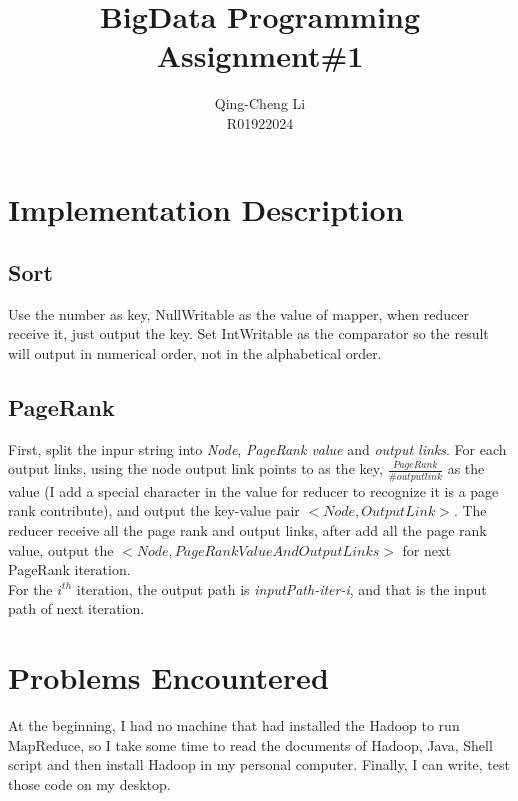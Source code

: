 \documentclass[11pt]{article}
\title{\textbf{BigData Programming Assignment\#1}}
\author{Qing-Cheng Li\\
R01922024}
\date{}
\begin{document}
\maketitle

\section{Implementation Description}

\subsection{Sort}

Use the number as key, NullWritable as the value of mapper, when reducer receive it, just output the key. Set IntWritable as the comparator so the result will output in numerical order, not in the alphabetical order.

\subsection{PageRank}

First, split the inpur string into \emph{Node}, \emph{PageRank value} and \emph{output links}. For each output links, using the node output link points to as the key, $\frac{PageRank}{\#outputlink}$ as the value (I add a special character in the value for reducer to recognize it is a page rank contribute), and output the key-value pair $<Node,OutputLink>$. The reducer receive all the page rank and output links, after add all the page rank value, output the $<Node,PageRankValueAndOutputLinks>$ for next PageRank iteration.\\
For the $i^{th}$ iteration, the output path is \emph{inputPath-iter-i}, and that is the input path of next iteration.

\section{Problems Encountered}

At the beginning, I had no machine that had installed the Hadoop to run MapReduce, so I take some time to read the documents of Hadoop, Java, Shell script and then install Hadoop in my personal computer. Finally, I can write, test those code on my desktop.
\end{document}
